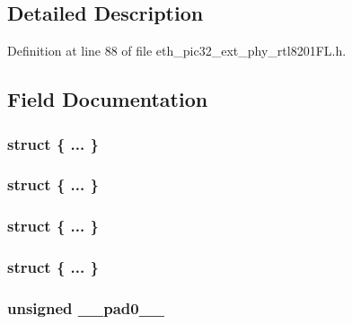 \subsection{Detailed Description}


Definition at line 88 of file eth\+\_\+pic32\+\_\+ext\+\_\+phy\+\_\+rtl8201\+F\+L.\+h.



\subsection{Field Documentation}
\hypertarget{union_____b_m_s_t_a_tbits__t_ad03cff2e2575409e3fd2ea40dd376251}{}\subsubsection[{"@104}]{\setlength{\rightskip}{0pt plus 5cm}struct \{ ... \} }\label{union_____b_m_s_t_a_tbits__t_ad03cff2e2575409e3fd2ea40dd376251}
\hypertarget{union_____b_m_s_t_a_tbits__t_ac88cf57c59391f59f023d90c37588064}{}\subsubsection[{"@106}]{\setlength{\rightskip}{0pt plus 5cm}struct \{ ... \} }\label{union_____b_m_s_t_a_tbits__t_ac88cf57c59391f59f023d90c37588064}
\hypertarget{union_____b_m_s_t_a_tbits__t_a9d9617206d309b74b6c938d71cf49383}{}\subsubsection[{"@176}]{\setlength{\rightskip}{0pt plus 5cm}struct \{ ... \} }\label{union_____b_m_s_t_a_tbits__t_a9d9617206d309b74b6c938d71cf49383}
\hypertarget{union_____b_m_s_t_a_tbits__t_a628cc16f19078156b40cd5e81c816bf4}{}\subsubsection[{"@178}]{\setlength{\rightskip}{0pt plus 5cm}struct \{ ... \} }\label{union_____b_m_s_t_a_tbits__t_a628cc16f19078156b40cd5e81c816bf4}
\hypertarget{union_____b_m_s_t_a_tbits__t_adf71f3d8410c1f1dbbc96680a92c49af}{}
\subsubsection[{\+\_\+\+\_\+pad0\+\_\+\+\_\+}]{\setlength{\rightskip}{0pt plus 5cm}unsigned \+\_\+\+\_\+pad0\+\_\+\+\_\+}\label{union_____b_m_s_t_a_tbits__t_adf71f3d8410c1f1dbbc96680a92c49af}


